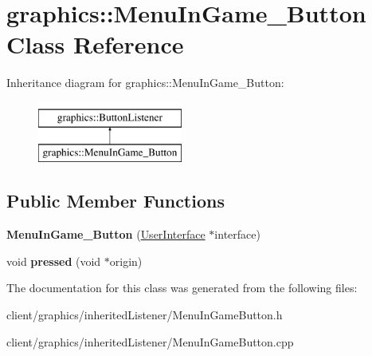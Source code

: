 \hypertarget{classgraphics_1_1_menu_in_game___button}{\section{graphics\-:\-:Menu\-In\-Game\-\_\-\-Button Class Reference}
\label{classgraphics_1_1_menu_in_game___button}
}
Inheritance diagram for graphics\-:\-:Menu\-In\-Game\-\_\-\-Button\-:\begin{figure}[H]
\begin{center}
\leavevmode
\includegraphics[height=2.000000cm]{classgraphics_1_1_menu_in_game___button}
\end{center}
\end{figure}
\subsection*{Public Member Functions}
\begin{DoxyCompactItemize}
\item 
\hypertarget{classgraphics_1_1_menu_in_game___button_aa2471fc7429703846d20c2766bfe7b13}{{\bfseries Menu\-In\-Game\-\_\-\-Button} (\hyperlink{classgraphics_1_1_user_interface}{User\-Interface} $\ast$interface)}\label{classgraphics_1_1_menu_in_game___button_aa2471fc7429703846d20c2766bfe7b13}

\item 
\hypertarget{classgraphics_1_1_menu_in_game___button_add14985b97dbbb3a273026ffec0b6c44}{void {\bfseries pressed} (void $\ast$origin)}\label{classgraphics_1_1_menu_in_game___button_add14985b97dbbb3a273026ffec0b6c44}

\end{DoxyCompactItemize}


The documentation for this class was generated from the following files\-:\begin{DoxyCompactItemize}
\item 
client/graphics/inherited\-Listener/Menu\-In\-Game\-Button.\-h\item 
client/graphics/inherited\-Listener/Menu\-In\-Game\-Button.\-cpp\end{DoxyCompactItemize}
